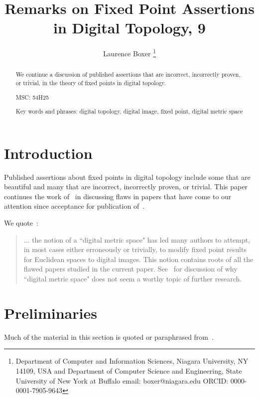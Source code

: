 \documentclass{article}
\numberwithin{thm}{section}
\begin{document}
\title{Remarks on Fixed Point Assertions in Digital Topology, 9}
\author{Laurence Boxer
\thanks{Department of Computer and Information Sciences, Niagara University, NY 14109, USA
and  \newline
Department of Computer Science and Engineering, State University of New York at Buffalo \newline
email: boxer@niagara.edu
\newline
ORCID: 0000-0001-7905-9643
}
}

\date{ }
\maketitle

\begin{abstract}
We continue a discussion of
published assertions that are incorrect, incorrectly
proven, or trivial, in the theory
of fixed points in digital topology.

MSC: 54H25

Key words and phrases: digital topology, digital image,
fixed point, digital metric space
\end{abstract}

\section{Introduction}
Published assertions about fixed points in digital topology include
some that are beautiful and many that are incorrect, incorrectly
proven, or trivial. This paper continues the work
of~\cite{BxSt19, Bx19, Bx19-3, Bx20, Bx22, BxBad6, BxBad7, BxBad8}
in discussing flaws in papers that have come to our
attention since acceptance for publication of~\cite{BxBad8}.

We quote~\cite{BxBad8}:
\begin{quote}
... the notion of
a ``digital metric space" has led many authors to attempt,
in most cases either erroneously or trivially, to modify fixed
point results for Euclidean spaces to digital images. 
This notion contains roots of all the
flawed papers studied in the current paper.
See~\cite{Bx20} for discussion of why ``digital metric space"
does not seem a worthy topic of further research.
\end{quote}

\section{Preliminaries}
Much of the material in this section is quoted or
paraphrased from~\cite{Bx20}.
\end{document}
